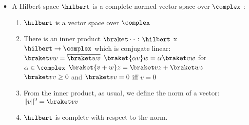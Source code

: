\documentclass{slides}
\begin{document}
\begin{slide}{}


\begin{itemize}
	\item A Hilbert space $\hilbert$ is a complete normed vector space over $\complex$ :
	\begin{enumerate}
		\item $\hilbert$ is a vector space over $\complex$
		\item There is an inner product \newline
			$\braket \cdot \cdot$ : $\hilbert$ x $\hilbert \rightarrow \complex$
			\newline
			which is conjugate linear: \newline
			$\braket v w = \overline{\braket w v} $  \newline
			$\braket {\alpha v} w = \alpha \braket v w $
				for $\alpha \in \complex$ \newline
			$\braket {v+w} z = \braket v z + \braket w z $ \newline
			$\braket vv \ge 0$ \newline
			and \newline
			$\braket vv = 0$ iff $v = 0$
		\item From the inner product, as usual, we define the norm of a vector: \newline
			$ \Vert v \Vert ^ 2 = \braket v v $
		\item $\hilbert$ is complete with respect to the norm.
	\end{enumerate}
	
\end{itemize}

\end{slide}
\end{document}
